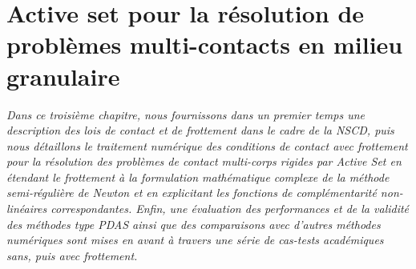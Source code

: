 \chapter{Active set pour la résolution de problèmes multi-contacts en milieu granulaire}\label{chap:active-set-granulaire}



\newcommand{\longrightharpoonup}{\,\,-\!\!\!\rightharpoonup}
\def\BBox{\hbox{\vrule height 8pt depth 0pt width 8pt}}
\newtheorem{remark}{Remark}
\newtheorem{problem}{Problem}
\newtheorem{assumption}{Assumption}
\newcommand{\R}{{\if mm {\rm I}\mkern -3mu{\rm R}\else \leavevmode
		\hbox{I}\kern -.17em\hbox{R} \fi}}

\newcommand{\bR}{\mbox{\boldmath{$R$}}}


\def\fl{\overrightarrow}
\newcommand{\qp}{\dot{\bf{q}}}

\newcommand{\un}{\tilde{{{u}}}_n}
\newcommand{\vp}{\tilde{{{\bf v}}}}
\newcommand{\vn}{\tilde{{{v}}}_n}

\newcommand{\st}{\textbf r}
\newcommand{\sn}{r_n}
\newcommand{\ta}{{\mathbf \tau}}
\newcommand{\Db}{{\bf D}^{c,i}}
\newcommand{\Dn}{{D}^{c,i}_n}
\newcommand{\Dt}{{\bf D}^{c,i}_t}
\newcommand{\Ab}{{\bf A}^{c,i}}
\newcommand{\An}{{A}^{c,i}_n}
\newcommand{\At}{{\bf A}^{c,i}_t}
\newcommand{\Xp}{\dot{\bf X}}
\newcommand{\Zt}{{\bf Z}}
\newcommand{\WW}{\ensuremath{\mathbb W}}


\newcommand{\vect}[1]{\boldsymbol{#1}}


\newenvironment{pruf}[1][Preuve]{\textit{#1. }}{\ \rule{0.5em}{0.5em}}

\newenvironment{remarque1}{\textbf{Remarque 1:}}{}
\newenvironment{remarque2}{\textbf{Remarque 2:}}{}

\vspace{1cm}


\textit{Dans ce troisième chapitre, nous fournissons dans un premier temps une description des lois de contact et de frottement dans le cadre de la NSCD, puis nous détaillons le traitement numérique des conditions de contact avec frottement pour la résolution des problèmes de contact multi-corps rigides par Active Set en étendant le frottement à la formulation mathématique complexe de la méthode semi-régulière de Newton et en explicitant les fonctions de complémentarité non-linéaires correspondantes. Enfin, une évaluation des performances et de la validité des méthodes type PDAS ainsi que des comparaisons avec d'autres méthodes numériques sont mises en avant à travers une série de cas-tests académiques sans, puis avec frottement.}

